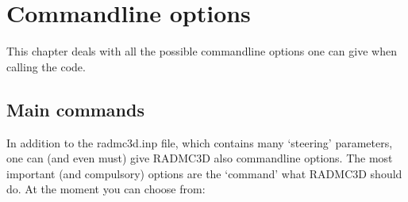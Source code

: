 \documentclass[letterpaper,10pt,english]{sphinxmanual}
\begin{document}
\chapter{Command\sphinxhyphen{}line options}
\label{\detokenize{clioptions:command-line-options}}\label{\detokenize{clioptions:chap-command-line-options}}\label{\detokenize{clioptions::doc}}
This chapter deals with all the possible command\sphinxhyphen{}line options one can
give when calling the  code.


\section{Main commands}
\label{\detokenize{clioptions:main-commands}}
In addition to the radmc3d.inp file, which contains many ‘steering’ parameters,
one can (and even must) give RADMC\sphinxhyphen{}3D also command\sphinxhyphen{}line options. The most
important (and compulsory) options are the ‘command’ what RADMC\sphinxhyphen{}3D should do.
At the moment you can choose from:
\end{document}
